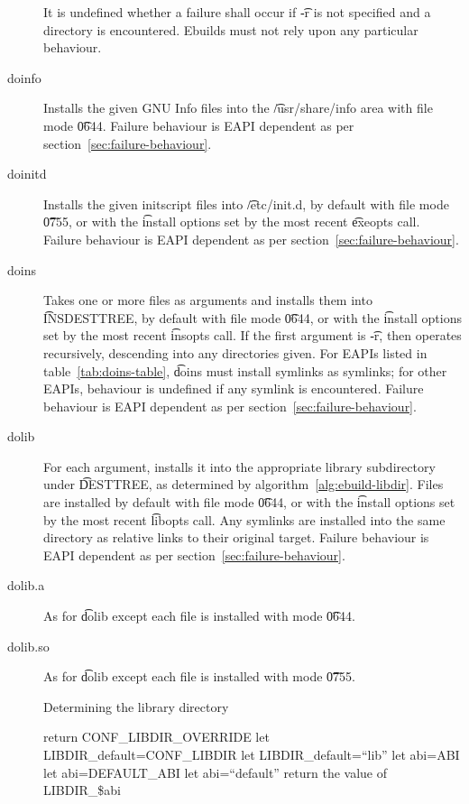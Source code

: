 \begin{description}
    It is undefined whether a failure shall occur if \t{-r} is not specified and a directory is
    encountered. Ebuilds must not rely upon any particular behaviour.

\item[doinfo] Installs the given GNU Info files into the \t{/usr/share/info} area with file mode
    \t{0644}. Failure behaviour is EAPI dependent as per section~\ref{sec:failure-behaviour}.

\item[doinitd] Installs the given initscript files into \t{/etc/init.d}, by default with file mode
    \t{0755}, or with the \t{install} options set by the most recent \t{exeopts} call.
    Failure behaviour is EAPI dependent as per section~\ref{sec:failure-behaviour}.

\item[doins]  Takes one or more files as arguments and installs them into
    \t{INSDESTTREE}, by default with file mode \t{0644}, or with the \t{install} options set by
    the most recent \t{insopts} call. If the first argument is \t{-r}, then operates recursively,
    descending into any directories given. For EAPIs listed in table~\ref{tab:doins-table},
    \t{doins} must install symlinks as symlinks; for other EAPIs, behaviour is undefined if any
    symlink is encountered. Failure behaviour is EAPI dependent as per
    section~\ref{sec:failure-behaviour}.

\item[dolib] For each argument, installs it into the appropriate library subdirectory under
    \t{DESTTREE}, as determined by algorithm~\ref{alg:ebuild-libdir}. Files are installed by default
    with file mode \t{0644}, or with the \t{install} options set by the most recent \t{libopts}
    call. Any symlinks are installed into the same directory as relative links to their original
    target. Failure behaviour is EAPI dependent as per section~\ref{sec:failure-behaviour}.

\item[dolib.a] As for \t{dolib} except each file is installed with mode \t{0644}.

\item[dolib.so] As for \t{dolib} except each file is installed with mode \t{0755}.

\begin{algorithm}
\caption{Determining the library directory} \label{alg:ebuild-libdir}
\begin{algorithmic}[1]
    \STATE return CONF_LIBDIR_OVERRIDE
\ENDIF
{}
    \STATE let LIBDIR_default=CONF_LIBDIR
\ELSE
    \STATE let LIBDIR_default=``lib''
\ENDIF
{}
    \STATE let abi=ABI
    \STATE let abi=DEFAULT_ABI
\ELSE
    \STATE let abi=``default''
\ENDIF
\STATE return the value of LIBDIR_\$abi
\end{algorithmic}
\end{algorithm}


\end{description}
